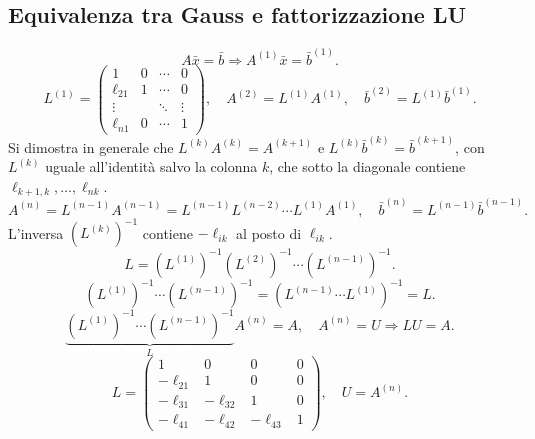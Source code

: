 \documentclass[11pt,a4paper]{article}
\newcommand{\pagina}[1]{\clearpage}
\begin{document}
\subsection*{Equivalenza tra Gauss e fattorizzazione LU}
\[A\bar x=\bar b\Longrightarrow A^{(1)}\bar x=\bar b^{(1)}.\]
\[L^{(1)}=\begin{pmatrix}1&0&\cdots&0\\\ell_{21}&1&\cdots&0\\\vdots& &\ddots&\vdots\\\ell_{n1}&0&\cdots&1\end{pmatrix},\quad A^{(2)}=L^{(1)}A^{(1)},\quad\bar b^{(2)}=L^{(1)}\bar b^{(1)}.\]
Si dimostra in generale che $L^{(k)}A^{(k)}=A^{(k+1)}$ e $L^{(k)}\bar b^{(k)}=\bar b^{(k+1)}$, con $L^{(k)}$ uguale all'identità salvo la colonna $k$, che sotto la diagonale contiene $\ell_{k+1,k},\ldots,\ell_{nk}$.
\[A^{(n)}=L^{(n-1)}A^{(n-1)}=L^{(n-1)}L^{(n-2)}\cdots L^{(1)}A^{(1)},\quad\bar b^{(n)}=L^{(n-1)}\bar b^{(n-1)}.\]
L'inversa $(L^{(k)})^{-1}$ contiene $-\ell_{ik}$ al posto di $\ell_{ik}$.
\[L=(L^{(1)})^{-1}(L^{(2)})^{-1}\cdots(L^{(n-1)})^{-1}.\]
\pagina{27}
\[(L^{(1)})^{-1}\cdots(L^{(n-1)})^{-1}=(L^{(n-1)}\cdots L^{(1)})^{-1}=L.\]
\[\underbrace{(L^{(1)})^{-1}\cdots(L^{(n-1)})^{-1}}_L A^{(n)}=A,\quad A^{(n)}=U\Longrightarrow LU=A.\]
\[L=\begin{pmatrix}1&0&0&0\\-\ell_{21}&1&0&0\\-\ell_{31}&-\ell_{32}&1&0\\-\ell_{41}&-\ell_{42}&-\ell_{43}&1\end{pmatrix},\quad U=A^{(n)}.\]
\end{document}
